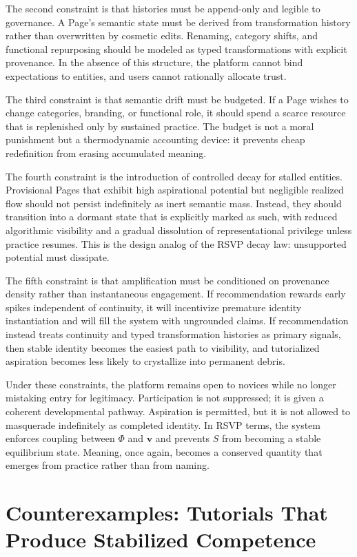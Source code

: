 \documentclass[11pt,oneside]{article}
\begin{document}
The second constraint is that histories must be append-only and legible to governance. A Page’s semantic state must be derived from transformation history rather than overwritten by cosmetic edits. Renaming, category shifts, and functional repurposing should be modeled as typed transformations with explicit provenance. In the absence of this structure, the platform cannot bind expectations to entities, and users cannot rationally allocate trust.

The third constraint is that semantic drift must be budgeted. If a Page wishes to change categories, branding, or functional role, it should spend a scarce resource that is replenished only by sustained practice. The budget is not a moral punishment but a thermodynamic accounting device: it prevents cheap redefinition from erasing accumulated meaning.

The fourth constraint is the introduction of controlled decay for stalled entities. Provisional Pages that exhibit high aspirational potential but negligible realized flow should not persist indefinitely as inert semantic mass. Instead, they should transition into a dormant state that is explicitly marked as such, with reduced algorithmic visibility and a gradual dissolution of representational privilege unless practice resumes. This is the design analog of the RSVP decay law: unsupported potential must dissipate.

The fifth constraint is that amplification must be conditioned on provenance density rather than instantaneous engagement. If recommendation rewards early spikes independent of continuity, it will incentivize premature identity instantiation and will fill the system with ungrounded claims. If recommendation instead treats continuity and typed transformation histories as primary signals, then stable identity becomes the easiest path to visibility, and tutorialized aspiration becomes less likely to crystallize into permanent debris.

Under these constraints, the platform remains open to novices while no longer mistaking entry for legitimacy. Participation is not suppressed; it is given a coherent developmental pathway. Aspiration is permitted, but it is not allowed to masquerade indefinitely as completed identity. In RSVP terms, the system enforces coupling between $\Phi$ and $\mathbf{v}$ and prevents $S$ from becoming a stable equilibrium state. Meaning, once again, becomes a conserved quantity that emerges from practice rather than from naming.

\section{Counterexamples: Tutorials That Produce Stabilized Competence}
\end{document}
